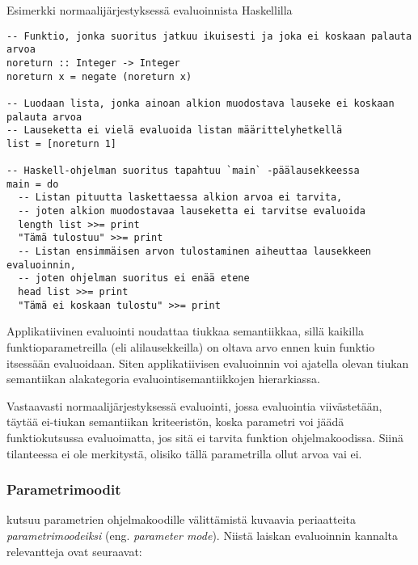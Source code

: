 \begin{listing}[H]
  \caption{Esimerkki normaalijärjestyksessä evaluoinnista Haskellilla}
  \label{codehaskellnormalorder}
  \bigskip
  \begin{verbatim}
-- Funktio, jonka suoritus jatkuu ikuisesti ja joka ei koskaan palauta arvoa
noreturn :: Integer -> Integer
noreturn x = negate (noreturn x)

-- Luodaan lista, jonka ainoan alkion muodostava lauseke ei koskaan palauta arvoa
-- Lauseketta ei vielä evaluoida listan määrittelyhetkellä
list = [noreturn 1]

-- Haskell-ohjelman suoritus tapahtuu `main` -päälausekkeessa
main = do
  -- Listan pituutta laskettaessa alkion arvoa ei tarvita,
  -- joten alkion muodostavaa lauseketta ei tarvitse evaluoida
  length list >>= print
  "Tämä tulostuu" >>= print
  -- Listan ensimmäisen arvon tulostaminen aiheuttaa lausekkeen evaluoinnin,
  -- joten ohjelman suoritus ei enää etene
  head list >>= print
  "Tämä ei koskaan tulostu" >>= print

  \end{verbatim}
\end{listing}

Applikatiivinen evaluointi noudattaa tiukkaa semantiikkaa, sillä kaikilla funktioparametreilla (eli alilausekkeilla) on oltava arvo ennen kuin funktio itsessään evaluoidaan. Siten applikatiivisen evaluoinnin voi ajatella olevan tiukan semantiikan alakategoria evaluointisemantiikkojen hierarkiassa.

Vastaavasti normaalijärjestyksessä evaluointi, jossa evaluointia viivästetään, täytää ei-tiukan semantiikan kriteeristön, koska parametri voi jäädä funktiokutsussa evaluoimatta, jos sitä ei tarvita funktion ohjelmakoodissa. Siinä tilanteessa ei ole merkitystä, olisiko tällä parametrilla ollut arvoa vai ei.

\subsubsection{Parametrimoodit}

\citep{scott2009programming} kutsuu parametrien ohjelmakoodille välittämistä kuvaavia periaatteita \textit{parametrimoodeiksi} (eng. \textit{parameter mode}). Niistä laiskan evaluoinnin kannalta relevantteja ovat seuraavat:

